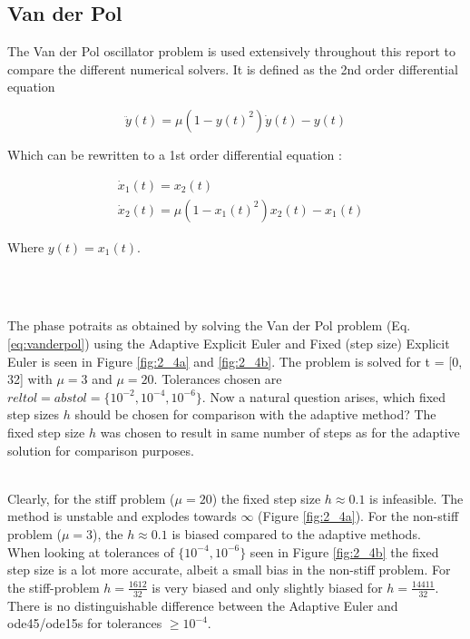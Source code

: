 \subsection{Van der Pol}
The Van der Pol oscillator problem is used extensively throughout this report to compare the different numerical solvers. It is defined as the 2nd order differential equation

\begin{equation}
\ddot{y}(t)=\mu\left(1-y(t)^{2}\right) \dot{y}(t)-y(t)
\end{equation}

Which can be rewritten to a 1st order differential equation \cite{JrgensenScientificEquationse}: 

\begin{equation}
\label{eq:vanderpol}
\begin{aligned}
&\dot{x}_{1}(t)=x_{2}(t) \\
&\dot{x}_{2}(t)=\mu\left(1-x_{1}(t)^{2}\right) x_{2}(t)-x_{1}(t)
\end{aligned}
\end{equation}

Where $y(t) = x_{1}(t)$.


\\\

The phase potraits as obtained by solving the Van der Pol problem (Eq. \ref{eq:vanderpol}) using the Adaptive Explicit Euler and Fixed (step size) Explicit Euler is seen in Figure \ref{fig:2_4a} and \ref{fig:2_4b}. The problem is solved for t = [0, 32] with $\mu = 3$ and $\mu =20$. Tolerances chosen are $reltol = abstol = \{10^{-2}, 10^{-4}, 10^{-6}\}$. Now a natural question arises, which fixed step sizes $h$ should be chosen for comparison with the adaptive method? The fixed step size $h$ was chosen to result in same number of steps as for the adaptive solution for comparison purposes.

\\
Clearly, for the stiff problem ($\mu = 20$) the fixed step size $h \approx 0.1$ is infeasible. The method is unstable and explodes towards $\infty$ (Figure \ref{fig:2_4a}). For the non-stiff problem ($\mu = 3$), the $h \approx 0.1$ is biased compared to the adaptive methods.
\\

When looking at tolerances of $\{10^{-4}, 10^{-6}\}$ seen in Figure \ref{fig:2_4b} the fixed step size is a lot more accurate, albeit a small bias in the non-stiff problem. For the stiff-problem $h=\frac{1612}{32}$ is very biased and only slightly biased for $h=\frac{14411}{32}$. There is no distinguishable difference between the Adaptive Euler and ode45/ode15s for tolerances $\geq 10^{-4}$.
\\

